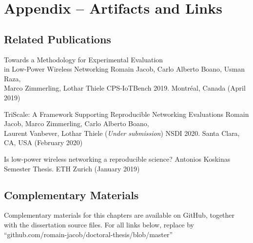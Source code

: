 \section{Appendix -- Artifacts and Links}
\label{append:triscale_artifacts}

\subsection{Related Publications}

\inlineRef%
{Towards a Methodology for Experimental Evaluation\\
in Low-Power Wireless Networking}%
{Romain Jacob, Carlo Alberto Boano, Usman Raza,\\
Marco Zimmerling, Lothar Thiele}%
{CPS-IoTBench 2019. Montréal, Canada (April 2019)}


\inlineRef%
{TriScale: A Framework Supporting Reproducible Networking Evaluations}%
{Romain Jacob, Marco Zimmerling, Carlo Alberto Boano,\\
Laurent Vanbever, Lothar Thiele}%
{(\emph{Under submission}) NSDI 2020. Santa Clara, CA, USA (February 2020)}


\inlineRef%
{Is low-power wireless networking a reproducible science?}%
{Antonios Koskinas}%
{Semester Thesis. ETH Zurich (January 2019)}


\subsection{Complementary Materials}
Complementary materials for this chapters are available on GitHub, together with the dissertation source files. For all links below, replace \linkroot  by ``{github.com/romain-jacob/doctoral-thesis/blob/master}''


